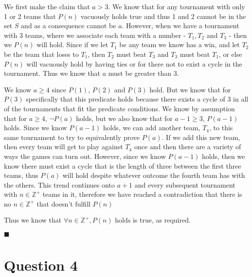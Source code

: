 \documentclass[20pt]{article}
\begin{document}
\noindent 
\begin{text}
    We first make the claim that $a > 3$. We know that for any tournament with only 1 or 2 teams that $P(n)$ vacuously holds true and thus 1 and 2 cannot be in the set $S$ and as a consequence cannot be $a$. However, when we have a tournament with 3 teams, where we associate each team with a number - $T_1, T_2$ and $T_3$ - then we $P(n)$ will hold. Since if we let $T_1$ be any team we know has a win, and let $T_2$ be the team that loses to $T_1$, then $T_2$ must beat $T_3$ and $T_3$ must beat $T_1$, or else $P(n)$ will vacuously hold by having ties or for there not to exist a cycle in the tournament. Thus we know that $a$ must be greater than 3.\\
\end{text}

\noindent 
\begin{text}
    We know $a \geq 4$ since $P(1)$, $P(2)$ and $P(3)$ hold. But we know that for $P(3)$ specifically that this predicate holds because there exists a cycle of 3 in all of the tournaments that fit the predicate conditions. We know by assumption that for $a \geq 4$, $\neg P(a)$ holds, but we also know that for $a - 1 \geq 3$, $P(a-1)$ holds. Since we know $P(a-1)$ holds, we can add another team, $T_4$, to this same tournament to try to equivalently prove $P(a)$. If we add this new team, then every team will get to play against $T_4$ once and then there are a variety of ways the games can turn out. However, since we know $P(a-1)$ holds, then we know there must exist a cycle that is the length of three between the first three teams, thus $P(a)$ will hold despite whatever outcome the fourth team has with the others. This trend continues onto $a + 1$ and every subsequent tournament with $n \in \mathbb{Z}^+$ teams in it, therefore we have reached a contradiction that there is no $n \in \mathbb{Z}^+$ that doesn't fulfill $P(n)$\\
\end{text}

\noindent 
\begin{text}
    Thus we know that $\forall n \in \mathbb{Z}^+, P(n) \text{ holds}$ is true, as required.
\end{text}

\hfill $\blacksquare$


\newpage

\section*{Question 4}
\end{document}
